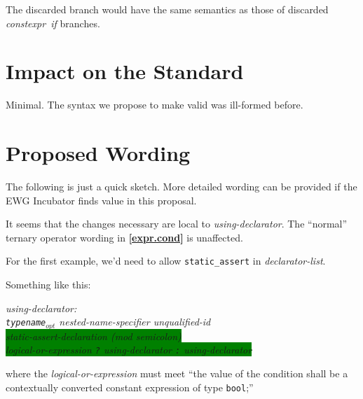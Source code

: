 \documentclass[11pt]{article}
\newcommand{\wgpaper}[1]{\href{https://wg21.link/#1}{#1}}
\newcommand{\isref}[1]{\textbf{[\wgpaper{#1}]}}
\newcommand{\isnref}[2]{\textbf{[\href{https://wg21.link/#1\##2}{#1}]/#2}}
\begin{document}
The discarded branch would have the same semantics as those of
discarded \emph{constexpr~if} branches.

\section{Impact on the Standard}

Minimal. The syntax we propose to make valid was ill-formed before.

\section{Proposed Wording}

The following is just a quick sketch. More detailed wording can be
provided if the EWG Incubator finds value in this proposal.

It seems that the changes necessary are local to
\emph{using-declarator}. The ``normal'' ternary operator wording in
\isref{expr.cond} is unaffected.

For the first example, we'd need to allow \texttt{static\_assert} in
\emph{declarator-list}.

Something like this:

  \emph{
  using-declarator:\\
  \hspace*{1cm} \texttt{typename$_{opt}$} nested-name-specifier unqualified-id\\
  \hspace*{1cm} \colorbox{green}{static-assert-declaration (mod semicolon)}\\
  \hspace*{1cm} \colorbox{green}{logical-or-expression \texttt? using-declarator \texttt: using-declarator}
  }

where the \emph{logical-or-expression} must meet ``the value of the
condition shall be a contextually converted constant expression of
type \texttt{bool};''

\iffalse
\subsection{Changes to \cite{cpp2a}}

In \isnref{class.base.init}1, as well as in \isref{gram.class}, change
the production for \emph{ctor-initalizer} as indicated:

  \emph{
  ctor-initalizer:\\
  \hspace*{1cm}: mem-initializer-list\colorbox{green}{ ,$_{opt}$}
  }
\fi
\end{document}
